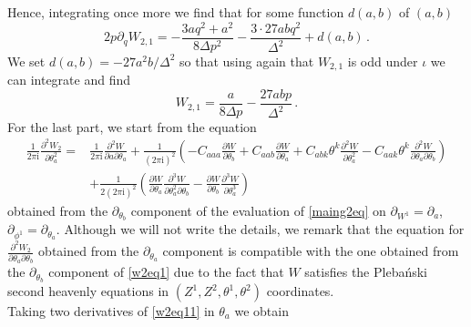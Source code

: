 \documentclass{article}
\theoremstyle{definition}
\numberwithin{equation}{section}
\begin{document}
Hence, integrating once more we find that for some function $d(a,b)$ of $(a,b)$
\begin{equation*}
    2p\partial_qW_{2,1}=-\frac{3aq^2+a^2}{8\Delta p^2}-\frac{3\cdot 27 abq^2}{\Delta^2}+d(a,b)\,.
\end{equation*}
We set $d(a,b)=-27a^2b/\Delta^2$ so that using again that $W_{2,1}$ is odd under $\iota $ we can integrate and find 
\begin{equation*}
    W_{2,1}=\frac{a}{8\Delta p}-\frac{27ab p}{\Delta^2}\,.
\end{equation*}
For the last part, we start from the equation 
\begin{equation}\label{w2eq11}
\begin{split}
\frac{1}{2\pi \mathrm{i}}\frac{\partial^2 W_2}{\partial \theta_a^2}=&\frac{1}{2\pi \mathrm{i}}\frac{\partial^2W}{\partial a \partial \theta_a}+\frac{1}{(2\pi \mathrm{i})^2}\left(-C_{aaa}\frac{\partial W}{\partial  \theta_b}+C_{aab}\frac{\partial W}{\partial \theta_a}+C_{abk}\theta^k\frac{\partial^2 W}{\partial \theta_a^2}-C_{aak}\theta^k\frac{\partial^2W}{\partial \theta_a \partial \theta_b}\right)\\
&+\frac{1}{2(2\pi \mathrm{i})^2}\left(\frac{\partial W}{\partial \theta_a}\frac{\partial^3W}{\partial \theta_a^2 \partial \theta_b}-\frac{\partial W}{\partial \theta_b}\frac{\partial^3 W}{\partial \theta_a^3}\right)\,
\end{split}
\end{equation}
obtained from the $\partial_{\theta_b}$ component of the evaluation of \eqref{maing2eq} on $\partial_{W^1}=\partial_a$, $\partial_{\phi^1}=\partial_{\theta_a}$. Although we will not write the details, we remark that the equation for $\frac{\partial^2W_2}{\partial \theta_a\partial\theta_b}$ obtained from the $\partial_{\theta_a}$ component is compatible with the one obtained from the $\partial_{\theta_b}$ component of \eqref{w2eq1} due to the fact that $W$ satisfies the Pleba\'nski second heavenly equations in $(Z^1,Z^2,\theta^1,\theta^2)$ coordinates. \\



Taking two derivatives of \eqref{w2eq11} in $\theta_a$ we obtain
\end{document}
